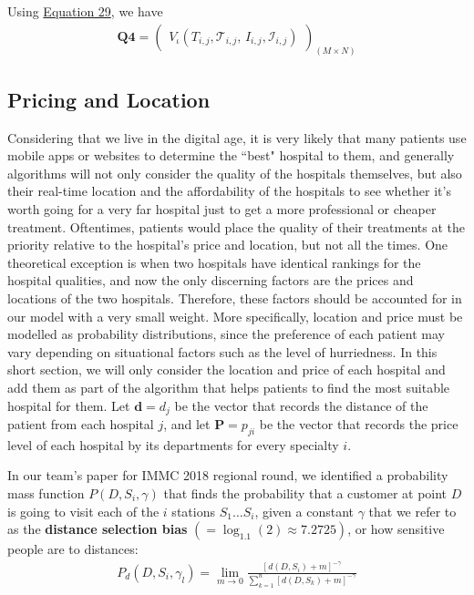 \documentclass{article}
\begin{document}
Using \hyperref[eqn:eval_func_mod_sir]{Equation 29}, we have
\begin{gather}
\mathbf{Q4}=
\begin{pmatrix}
V_\iota(T_{i,j},\mathcal{T}_{i,j},\,I_{i,j},\mathcal{I}_{i,j})
\end{pmatrix}_{(M\times N)}
\end{gather}

\subsection{Pricing and Location}

Considering that we live in the digital age, it is very likely that many patients use mobile apps or websites to determine the ``best" hospital to them, and generally algorithms will not only consider the quality of the hospitals themselves, but also their real-time location and the affordability of the hospitals to see whether it's worth going for a very far hospital just to get a more professional or cheaper treatment. Oftentimes, patients would place the quality of their treatments at the priority relative to the hospital's price and location, but not all the times. One theoretical exception is when two hospitals have identical rankings for the hospital qualities, and now the only discerning factors are the prices and locations of the two hospitals. Therefore, these factors should be accounted for in our model with a very small weight. More specifically, location and price must be modelled as probability distributions, since the preference of each patient may vary depending on situational factors such as the level of hurriedness. In this short section, we will only consider the location and price of each hospital and add them as part of the algorithm that helps patients to find the most suitable hospital for them. Let $\mathbf{d} = d_{j}$ be the vector that records the distance of the patient from each hospital $j$, and let $\mathbf{P} = p_{ji}$ be the vector that records the price level of each hospital by its departments for every specialty $i$.

In our team's paper for IMMC 2018 regional round, we identified a probability mass function $P\left(D, S_i, \gamma\right)$ that finds the probability that a customer at point $D$ is going to visit each of the $i$ stations $S_1\dots S_i$, given a constant $\gamma$ that we refer to as the \textbf{distance selection bias} $(= \log_{1.1}(2) \approx 7.2725)$, or how sensitive people are to distances:
\begin{gather}
    P_d\left(D, S_i, \gamma_l\right) = \lim_{m \to 0} \frac{\left[ d\left(D, S_i\right) + m \right]^{-\gamma}} {\displaystyle\sum_{k=1}^n \left[d\left(D, S_k\right) + m \right]^{-\gamma}}
\end{gather}
\end{document}
